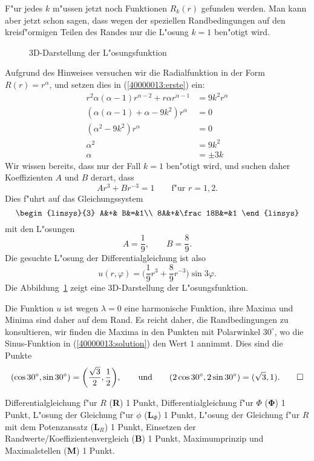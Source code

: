\begin{loesung}
\begin{teilaufgaben}
F"ur jedes $k$ m"ussen jetzt noch Funktionen $R_k(r)$ gefunden werden.
Man kann aber jetzt schon sagen, dass wegen der speziellen Randbedingungen
auf den kreisf"ormigen Teilen des Randes nur die L"osung $k=1$ ben"otigt wird.

\begin{figure}
\centering
{}
\caption{3D-Darstellung der L"osungsfunktion
\label{40000013:3d}}
\end{figure}
Aufgrund des Hinweises versuchen wir die Radialfunktion in der Form
$R(r)=r^\alpha$, und setzen dies in (\ref{40000013:erste}) ein:
\begin{align*}
r^2\alpha(\alpha-1)r^{\alpha-2}+r\alpha r^{\alpha-1}&=9k^2r^{\alpha}
\\
(\alpha(\alpha-1)+\alpha -9k^2)r^{\alpha}&=0
\\
(\alpha^2 -9k^2)r^{\alpha}&=0
\\
\alpha^2&=9k^2
\\
\alpha&=\pm3k
\end{align*}
Wir wissen bereits, dass nur der Fall $k=1$ ben"otigt wird, und suchen
daher Koeffizienten $A$ und $B$ derart, dass
\[
Ar^3+Br^{-3}=1\qquad \text{f"ur $r=1,2$.}
\]
Dies f"uhrt auf das Gleichungssystem
\[
\begin{linsys}{3}
 A&+&       B&=&1\\
8A&+&\frac18B&=&1
\end{linsys}
\]
mit den L"osungen
\[
A=\frac19,\qquad B=\frac89.
\]
Die gesuchte L"osung der Differentialgleichung ist also
\begin{equation}
u(r,\varphi)=\biggl(\frac19r^3+\frac89r^{-3}\biggr)\sin 3\varphi.
\label{40000013:solution}
\end{equation}
Die Abbildung~\ref{40000013:3d} zeigt eine 3D-Darstellung der L"osungsfunktion.
\item
Die Funktion $u$ ist wegen $\lambda=0$ eine harmonische Funktion, ihre
Maxima und Minima sind daher auf dem Rand.
Es reicht daher, die Randbedingungen zu konsultieren, wir finden die
Maxima in den Punkten mit Polarwinkel $30^\circ$, wo die Sinus-Funktion
in (\ref{40000013:solution}) den Wert $1$ annimmt.
Dies sind die Punkte
\[
(\cos 30^\circ, \sin 30^\circ)=\biggl(
\frac{\sqrt{3}}{2}
,
\frac12
\biggr),\qquad
\text{und}\qquad
(
2\cos 30^\circ
,
2\sin 30^\circ
)=(
\sqrt{3}
,
1
).
\qedhere
\]
\end{teilaufgaben}
\end{loesung}

\begin{bewertung}
Differentialgleichung f"ur $R$ ({\bf R}) 1 Punkt,
Differentialgleichung f"ur $\Phi$ ({$\mathbf \Phi$}) 1 Punkt,
L"osung der Gleichung f"ur $\phi$ ($\textbf{L}_\Phi$) 1 Punkt,
L"osung der Gleichung f"ur $R$ mit dem Potenzansatz ($\textbf{L}_R$) 1 Punkt,
Einsetzen der Randwerte/Koeffizientenvergleich ({\bf B}) 1 Punkt,
Maximumprinzip und Maximalstellen ({\bf M}) 1 Punkt.
\end{bewertung}



